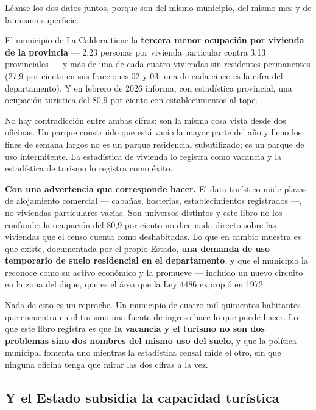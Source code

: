 \begin{cautela}
Léanse los dos datos juntos, porque son del mismo municipio, del mismo mes y de la misma superficie.

El municipio de La Caldera tiene la \textbf{tercera menor ocupación por vivienda de la provincia} --- 2,23 personas por vivienda particular contra 3,13 provinciales --- y más de una de cada cuatro viviendas sin residentes permanentes (27,9 por ciento en sus fracciones 02 y 03; una de cada cinco es la cifra del departamento). Y en febrero de 2026 informa, con estadística provincial, una ocupación turística del 80,9 por ciento con establecimientos al tope.

No hay contradicción entre ambas cifras: son la misma cosa vista desde dos oficinas. Un parque construido que está vacío la mayor parte del año y lleno los fines de semana largos no es un parque residencial subutilizado; es un parque de uso intermitente. La estadística de vivienda lo registra como vacancia y la estadística de turismo lo registra como éxito.

\textbf{Con una advertencia que corresponde hacer.} El dato turístico mide plazas de alojamiento comercial --- cabañas, hosterías, establecimientos registrados ---, no viviendas particulares vacías. Son universos distintos y este libro no los confunde: la ocupación del 80,9 por ciento no dice nada directo sobre las viviendas que el censo cuenta como deshabitadas. Lo que en cambio muestra es que existe, documentada por el propio Estado, \textbf{una demanda de uso temporario de suelo residencial en el departamento}, y que el municipio la reconoce como su activo económico y la promueve --- incluido un nuevo circuito en la zona del dique, que es el área que la Ley 4486 expropió en 1972.

Nada de esto es un reproche. Un municipio de cuatro mil quinientos habitantes que encuentra en el turismo una fuente de ingreso hace lo que puede hacer. Lo que este libro registra es que \textbf{la vacancia y el turismo no son dos problemas sino dos nombres del mismo uso del suelo}, y que la política municipal fomenta uno mientras la estadística censal mide el otro, sin que ninguna oficina tenga que mirar las dos cifras a la vez.
\end{cautela}


\subsection*{Y el Estado subsidia la capacidad turística}

